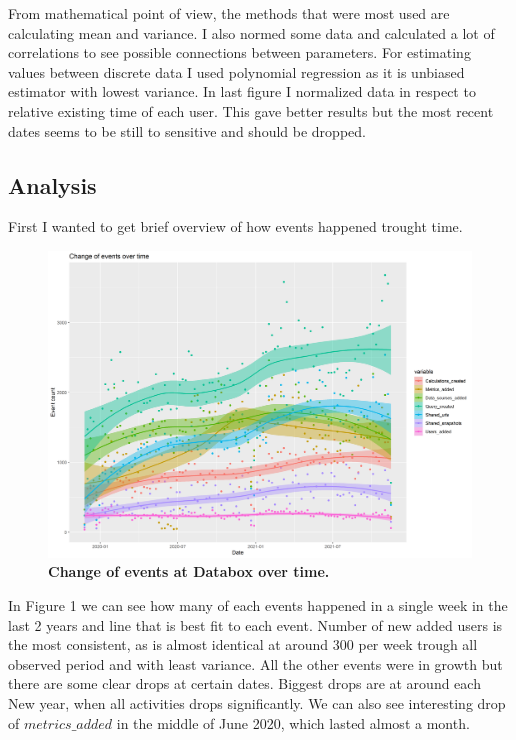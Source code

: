 \documentclass[fleqn,moreauthors,10pt]{ds_report}
\begin{document}
From mathematical point of view, the methods that were most used are calculating mean and variance. I also normed some data and calculated a lot of correlations to see possible connections between parameters. For estimating values between discrete data I used polynomial regression as it is unbiased estimator with lowest variance. In last figure I normalized data in respect to relative existing time of each user. This gave better results but the most recent dates seems to be still to sensitive and should be dropped. 
\subsection{Analysis}
First I wanted to get brief overview of how events happened trought time. 

\begin{figure}[H]\centering
	\includegraphics[width=\linewidth]{events_over_time.png}
	\caption{\textbf{Change of events at Databox over time.}  }
	\label{fig:events}
\end{figure}

In Figure 1 we can see how many of each events happened in a single week in the last 2 years and line that is best fit to each event. Number of new added users is the most consistent, as is almost identical at around 300 per week trough all observed period and with least variance. All the other events were in growth but there are some clear drops at certain dates. Biggest drops are at around each New year, when all activities drops significantly. We can also see interesting drop of $metrics\_added$ in the middle of June 2020, which lasted almost a month.
\end{document}
